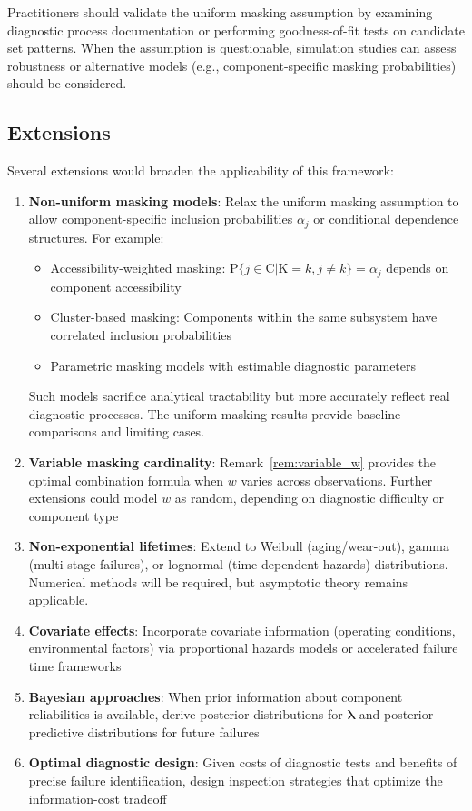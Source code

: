 \documentclass[pdflatex,sn-mathphys-num,Numbered]{sn-jnl}
\newcommand{\RV}[1]{\mathrm{#1}}
\newcommand{\Prob}[1]{\mathrm{P}\{#1\}}
\newcommand{\cand}{\RV{C}}         %
\renewcommand{\vec}[1]{\boldsymbol{#1}}
\theoremstyle{thmstyleone}
\theoremstyle{thmstylethree}
\theoremstyle{thmstyletwo}
\begin{document}
Practitioners should validate the uniform masking assumption by examining diagnostic process documentation or performing goodness-of-fit tests on candidate set patterns. When the assumption is questionable, simulation studies can assess robustness or alternative models (e.g., component-specific masking probabilities) should be considered.

\subsection{Extensions}

Several extensions would broaden the applicability of this framework:

\begin{enumerate}
\item \textbf{Non-uniform masking models}: Relax the uniform masking assumption to allow component-specific inclusion probabilities $\alpha_j$ or conditional dependence structures. For example:
\begin{itemize}
\item Accessibility-weighted masking: $\Prob{j \in \cand | \RV{K} = k, j \neq k} = \alpha_j$ depends on component accessibility
\item Cluster-based masking: Components within the same subsystem have correlated inclusion probabilities
\item Parametric masking models with estimable diagnostic parameters
\end{itemize}
Such models sacrifice analytical tractability but more accurately reflect real diagnostic processes. The uniform masking results provide baseline comparisons and limiting cases.

\item \textbf{Variable masking cardinality}: Remark~\ref{rem:variable_w} provides the optimal combination formula when $w$ varies across observations. Further extensions could model $w$ as random, depending on diagnostic difficulty or component type

\item \textbf{Non-exponential lifetimes}: Extend to Weibull (aging/wear-out), gamma (multi-stage failures), or lognormal (time-dependent hazards) distributions. Numerical methods will be required, but asymptotic theory remains applicable.

\item \textbf{Covariate effects}: Incorporate covariate information (operating conditions, environmental factors) via proportional hazards models or accelerated failure time frameworks

\item \textbf{Bayesian approaches}: When prior information about component reliabilities is available, derive posterior distributions for $\vec{\lambda}$ and posterior predictive distributions for future failures

\item \textbf{Optimal diagnostic design}: Given costs of diagnostic tests and benefits of precise failure identification, design inspection strategies that optimize the information-cost tradeoff
\end{enumerate}
\end{document}
